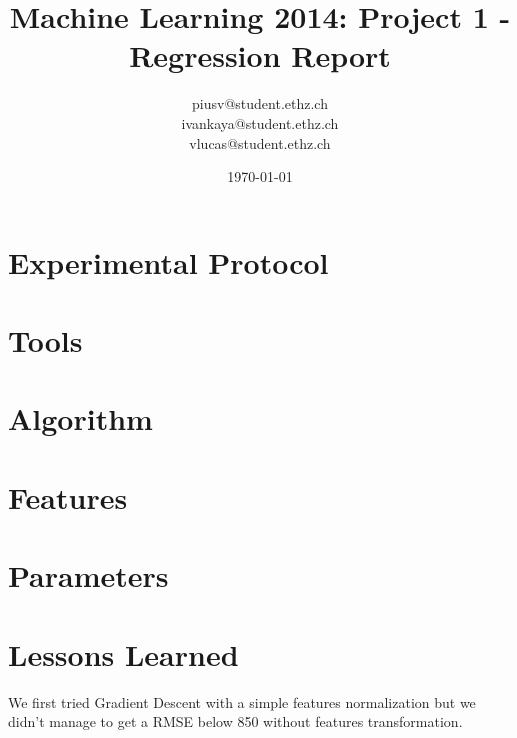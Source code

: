 \documentclass[a4paper, 11pt]{article}
\title{Machine Learning 2014: Project 1 - Regression Report}
\author{piusv@student.ethz.ch\\ ivankaya@student.ethz.ch\\ vlucas@student.ethz.ch\\}
\date{\today}
\begin{document}
\maketitle

\section*{Experimental Protocol}

\section{Tools}

\section{Algorithm}

\section{Features}

\section{Parameters}

\section{Lessons Learned}

We first tried Gradient Descent with a simple features normalization but we didn't manage to get a RMSE below 850 without features transformation.
\end{document}
